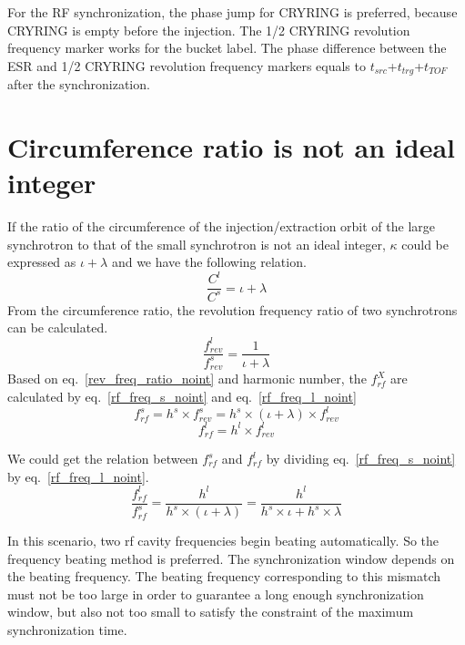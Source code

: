 For the RF synchronization, the phase jump for CRYRING is preferred, because CRYRING is empty before the injection. The 1/2 CRYRING revolution frequency marker works for the bucket label. The phase difference between the ESR and 1/2 CRYRING revolution frequency markers equals to $t_{src}$+$t_{trg}$+$t_{TOF}$ after the synchronization. 

\section{ Circumference ratio is not an ideal integer}
If the ratio of the circumference of the injection/extraction orbit of the large synchrotron to that of the small synchrotron is not an ideal integer, $\kappa$ could be expressed as $\iota + \lambda$ and we have the following relation.
\begin{equation}
\frac{C^l}{C^s}=\iota + \lambda \label{circumference_ratio_noint}
\end{equation}
From the circumference ratio, the revolution frequency ratio of two synchrotrons can be calculated.
\begin{equation}
\frac{f_{rev}^{l}}{f_{rev}^{s}}=\frac{1}{\iota+ \lambda} \label{rev_freq_ratio_noint}
\end{equation}
Based on eq.~\ref{rev_freq_ratio_noint} and harmonic number, the $f_{rf}^{X}$ are calculated by eq.~\ref{rf_freq_s_noint} and eq.~\ref{rf_freq_l_noint}
\begin{equation} 
f_{rf}^{s}= h^s \times f_{rev}^{s}=h^s \times (\iota+ \lambda) \times f_{rev}^{l} \label{rf_freq_s_noint}
\end{equation}
\begin{equation} 
f_{rf}^{l}= h^l \times f_{rev}^{l} \label{rf_freq_l_noint}
\end{equation}

We could get the relation between $f_{rf}^{s}$ and $f_{rf}^{l}$ by dividing eq.~\ref{rf_freq_s_noint} by eq.~\ref{rf_freq_l_noint}.
\begin{equation} 
\frac{f_{rf}^{l}}{f_{rf}^{s}}=\frac{h^l}{h^s \times (\iota+ \lambda)}=\frac{h^l}{h^s \times \iota+ h^s \times \lambda}\label{close_to_interger}
\end{equation}

In this scenario, two rf cavity frequencies begin beating automatically. So the frequency beating method is preferred. The synchronization window depends on the beating frequency. The beating frequency corresponding to this mismatch must not be too large in order to guarantee a long enough synchronization window, but also not too small to satisfy the constraint of the maximum synchronization time.
